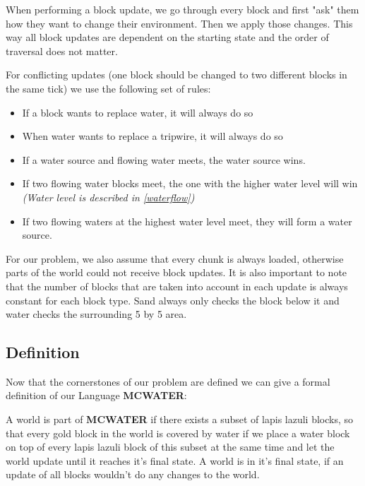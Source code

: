 \noindent When performing a block update, we go through every block and first "ask" them how they want to change their environment. Then we apply those changes. This way all block updates are dependent on the starting state and the order of traversal does not matter.

\noindent For conflicting updates (one block should be changed to two different blocks in the same tick) we use the following set of rules:

\begin{itemize}
    \item If a block wants to replace water, it will always do so
    \item When water wants to replace a tripwire, it will always do so
    \item If a water source and flowing water meets, the water source wins.
    \item If two flowing water blocks meet, the one with the higher water level will win \textit{(Water level is described in \ref{waterflow})}
    \item If two flowing waters at the highest water level meet, they will form a water source.
\end{itemize}

\noindent For our problem, we also assume that every chunk is always loaded, otherwise parts of the world could not receive block updates. It is also important to note that the number of blocks that are taken into account in each update is always constant for each block type. Sand always only checks the block below it and water checks the surrounding 5 by 5 area.

\subsection{Definition}

Now that the cornerstones of our problem are defined we can give a formal definition of our Language \textbf{MCWATER}:

\noindent A world is part of \textbf{MCWATER} if there exists a subset of lapis lazuli blocks, so that every gold block in the world is covered by water if we place a water block on top of every lapis lazuli block of this subset at the same time and let the world update until it reaches it's final state. A world is in it's final state, if an update of all blocks wouldn't do any changes to the world.

